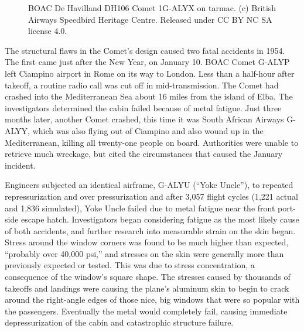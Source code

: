 \documentclass{AeroStructure-ERJohnson}
\begin{document}
\begin{figure}\vspace*{-5pt}
\caption{BOAC De Havilland DH106 Comet 1G-ALYX on tarmac. (c) British Airways Speedbird Heritage Centre. Released under CC BY NC SA license 4.0.}\label{fig13.1}\vspace*{-7pt}
\end{figure}

The structural flaws in the Comet's design caused two fatal accidents in 1954. The first came just after the New Year, on January 10. BOAC Comet G-ALYP left Ciampino airport in Rome on its way to London. Less than a half-hour after takeoff, a routine radio call was cut off in mid-transmission. The Comet had crashed into the Mediterranean Sea about 16 miles from the island of Elba. The investigators determined the cabin failed because of metal fatigue. Just three months later, another Comet crashed, this time it was South African Airways G-ALYY, which was also flying out of Ciampino and also wound up in the Mediterranean, killing all twenty-one people on board. Authorities were unable to retrieve much wreckage, but cited the circumstances that caused the January incident.

Engineers subjected an identical airframe, G-ALYU (``Yoke Uncle''), to repeated repressurization and over pressurization and after 3,057 flight cycles (1,221 actual and 1,836 simulated), Yoke Uncle failed due to metal fatigue near the front port-side escape hatch. Investigators began considering fatigue as the most likely cause of both accidents, and further research into measurable strain on the skin began. Stress around the window corners was found to be much higher than expected, ``probably over 40,000 psi,'' and stresses on the skin were generally more than previously expected or tested. This was due to stress concentration, a consequence of the window's square shape. The stresses caused by thousands of takeoffs and landings were causing the plane's aluminum skin to begin to crack around the right-angle edges of those nice, big windows that were so popular with the passengers. Eventually the metal would completely fail, causing immediate depressurization of the cabin and catastrophic structure failure.
\end{document}
